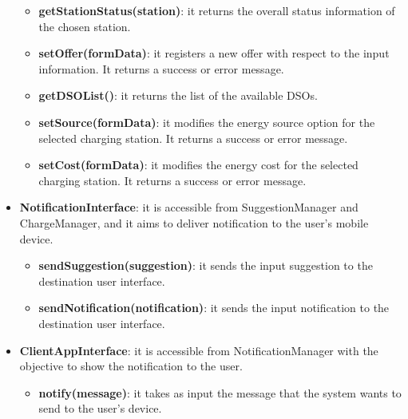 \documentclass[../main.tex]{subfiles}
\begin{document}
\begin{itemize}
\begin{itemize}
        \item \textbf{getStationStatus(station)}: it returns the overall status information of the chosen station.
        \item \textbf{setOffer(formData)}: it registers a new offer with respect to the input information. It returns a success or error message.
        \item \textbf{getDSOList()}: it returns the list of the available DSOs.
        \item \textbf{setSource(formData)}: it modifies the energy source option for the selected charging station. It returns a success or error message.
        \item \textbf{setCost(formData)}: it modifies the energy cost for the selected charging station. It returns a success or error message.
    \end{itemize}

    \item \textbf{NotificationInterface}: it is accessible from SuggestionManager and ChargeManager, and it aims to deliver notification to the user's mobile device.
    \begin{itemize}
        \item \textbf{sendSuggestion(suggestion)}: it sends the input suggestion to the destination user interface. 
        \item \textbf{sendNotification(notification)}: it sends the input notification to the destination user interface.
    \end{itemize}

    \item \textbf{ClientAppInterface}: it is accessible from NotificationManager with the objective to show the notification to the user.
    \begin{itemize}
        \item \textbf{notify(message)}: it takes as input the message that the system wants to send to the user's device.
    \end{itemize}
\end{itemize}
\end{document}
